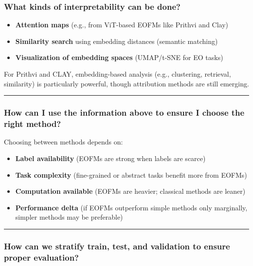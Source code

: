 \documentclass[
  letterpaper,
  DIV=11,
  numbers=noendperiod]{scrreprt}
\providecommand{\tightlist}{%
  \setlength{\itemsep}{0pt}\setlength{\parskip}{0pt}}\usepackage{longtable,booktabs,array}
\begin{document}
\subsubsection{What kinds of interpretability can be
done?}\label{what-kinds-of-interpretability-can-be-done}

\begin{itemize}
\tightlist
\item
  \textbf{Attention maps} (e.g., from ViT-based EOFMs like Prithvi and
  Clay)
\item
  \textbf{Similarity search} using embedding distances (semantic
  matching)
\item
  \textbf{Visualization of embedding spaces} (UMAP/t-SNE for EO tasks)
\end{itemize}

For Prithvi and CLAY, embedding-based analysis (e.g., clustering,
retrieval, similarity) is particularly powerful, though attribution
methods are still emerging.

\begin{center}\rule{0.5\linewidth}{0.5pt}\end{center}

\subsubsection{How can I use the information above to ensure I choose
the right
method?}\label{how-can-i-use-the-information-above-to-ensure-i-choose-the-right-method}

Choosing between methods depends on:

\begin{itemize}
\tightlist
\item
  \textbf{Label availability} (EOFMs are strong when labels are scarce)
\item
  \textbf{Task complexity} (fine-grained or abstract tasks benefit more
  from EOFMs)
\item
  \textbf{Computation available} (EOFMs are heavier; classical methods
  are leaner)
\item
  \textbf{Performance delta} (if EOFMs outperform simple methods only
  marginally, simpler methods may be preferable)
\end{itemize}

\begin{center}\rule{0.5\linewidth}{0.5pt}\end{center}

\subsubsection{How can we stratify train, test, and validation to ensure
proper
evaluation?}\label{how-can-we-stratify-train-test-and-validation-to-ensure-proper-evaluation}
\end{document}
